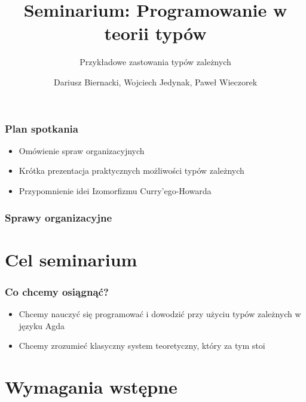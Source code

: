 \documentclass{beamer}
\title{Seminarium: Programowanie w teorii typów}
\subtitle{Przykładowe zastowania typów zależnych}
\author{Dariusz Biernacki, Wojciech Jedynak, Paweł Wieczorek}
\institute{Instytut Informatyki Uniwersytetu Wrocławskiego}
\begin{document}

\maketitle


\begin{frame}
\frametitle{Plan spotkania}

\begin{itemize}

\item Omówienie spraw organizacyjnych
\item Krótka prezentacja praktycznych możliwości typów zależnych 
\item Przypomnienie idei Izomorfizmu Curry'ego-Howarda

\end{itemize}

\end{frame}


\begin{frame}
\frametitle{Sprawy organizacyjne}

\tableofcontents[hidesubsections]

\end{frame}


\section{Cel seminarium}

\begin{frame}

\frametitle{Co chcemy osiągnąć?}

\begin{itemize}
\item Chcemy nauczyć się programować i dowodzić przy użyciu typów zależnych w języku Agda
\item Chcemy zrozumieć klasyczny system teoretyczny, który za tym stoi
\end{itemize}

\end{frame}


\section{Wymagania wstępne}
\end{document}
